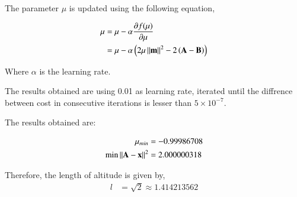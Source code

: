 \documentclass[journal,12pt,twocolumn]{IEEEtran}
\begin{document}
\begin{enumerate}
	The parameter $\mu$ is updated using the following equation,

	\begin{align}
		\mu &= \mu - \alpha \frac{\partial f(\mu)}{\partial \mu} \\
		&= \mu - \alpha \left( 2\mu \left\lVert\mathbf{m}\right\rVert^2 - 2 \left(\mathbf{A}-\mathbf{B}\right)\right) 
	\end{align}

Where $\alpha$ is the learning rate.

		The results obtained are using 0.01 as learning rate, iterated until the diffrence between cost in consecutive iterations is lesser than $5 \times 10^{-7}$.

		The results obtained are:

		\begin{align}
			\mu_{min} & = -0.99986708\\
			\text{min}\left\lVert\mathbf{A} - \mathbf{x}\right\rVert^2 & = 2.000000318
		\end{align}

Therefore, the length of altitude is given by,
		\begin{align}
			l &= \sqrt{2} \approx 1.414213562
		\end{align}

\end{enumerate}
\end{document}
